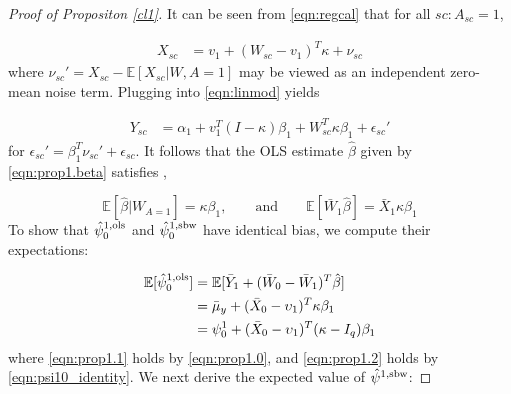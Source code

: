 \documentclass[aoas]{imsart}
\theoremstyle{plain}
\theoremstyle{remark}
\begin{document}
\begin{appendix}
\begin{proof}[Proof of Propositon \ref{cl1}]
It can be seen from \eqref{eqn:regcal} that for all $sc: A_{sc}=1$,

\begin{align*}
   X_{sc} &= v_1 + (W_{sc} - v_1)^T \kappa + \nu_{sc}
\end{align*}
where $\nu_{sc}' = X_{sc} - \mathbb{E}[X_{sc}|W,A=1]$ may be viewed as an independent zero-mean noise term. Plugging into \eqref{eqn:linmod} yields 

\begin{align*}
   Y_{sc} & = \alpha_1 + v_1^T (I - \kappa)\beta_1 + W_{sc}^T \kappa \beta_1 + \epsilon_{sc}'
\end{align*}
for $\epsilon_{sc}' = \beta_1^T\nu_{sc}' + \epsilon_{sc}$. It follows that the OLS estimate $\hat{\beta}$ given by \eqref{eqn:prop1.beta} satisfies \citep{gleser1992importance},

\begin{equation}\label{eqn:prop1.0}
\mathbb{E}[\hat{\beta}|W_{A=1}] = \kappa \beta_1, \qquad \text{and} \qquad \mathbb{E}[\bar{W}_1 \hat{\beta}] = \bar{X}_1 \kappa \beta_1
\end{equation}
To show that $\hat{\psi}_0^{1,\textup{ols}}$ and $\hat{\psi}_0^{1, \textup{sbw}}$ have identical bias, we compute their expectations:

\begin{align}
\nonumber	\mathbb{E}[\hat{\psi}_0^{1,\textup{ols}}] &= \mathbb{E}[ \bar{Y}_1 + (\bar{W}_0 - \bar{W}_1)^T \hat{\beta}] \\
	& = \bar{\mu}_y + (\bar{X}_0 - \upsilon_1)^T\kappa\beta_1 \label{eqn:prop1.1}\\
	& = \psi_0^1 + (\bar{X}_0 - \upsilon_1)^T(\kappa - I_q)\beta_1 \label{eqn:prop1.2}
\end{align}
where \eqref{eqn:prop1.1} holds by \eqref{eqn:prop1.0}, and \eqref{eqn:prop1.2} holds by \eqref{eqn:psi10_identity}. We next derive the expected value of $\hat{\psi}^{1, \textup{sbw}}$:


\end{proof}
\end{appendix}
\end{document}
